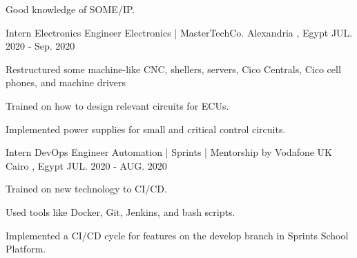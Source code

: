 \begin{cventries}
{\begin{cvitems}
        \item{\normalsize Good knowledge of SOME/IP.}
      \end{cvitems}
    }
  \cventry
    {\normalsize Intern Electronics Engineer} %
    {\newline \Large Electronics | MasterTechCo.} %
    {\normalsize Alexandria , Egypt} %
    {\normalsize JUL. 2020 - Sep. 2020} %
    {
      \begin{cvitems} %
        \item{\normalsize Restructured some machine-like CNC, shellers, servers, Cico Centrals, Cico cell phones, and machine drivers}
        \item{\normalsize Trained on how to design relevant circuits for ECUs.}
        \item{\normalsize Implemented power supplies for small and critical control circuits.}
      \end{cvitems}
    }
\cventry
{\normalsize Intern DevOps Engineer} %
{\newline \Large Automation | Sprints | Mentorship by Vodafone UK} %
{\normalsize Cairo , Egypt} %
{\normalsize JUL. 2020 - AUG. 2020} %
{
  \begin{cvitems} %
    \item{\normalsize Trained on new technology to CI/CD.}
    \item{\normalsize Used tools like Docker, Git, Jenkins, and bash scripts.}
    \item{\normalsize Implemented a CI/CD cycle for features on the develop branch in Sprints School Platform.\newline}
  \end{cvitems}
}
\end{cventries}
